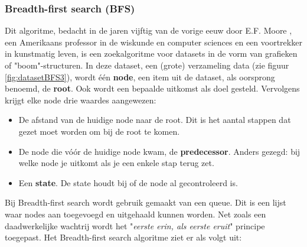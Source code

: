 \subsubsection{Breadth-first search (BFS)}
Dit algoritme, bedacht in de jaren vijftig van de vorige eeuw door E.F. Moore \cite{Moore}, een Amerikaans professor in de wiskunde en computer sciences en een voortrekker in kunstmatig leven, is een zoekalgoritme voor datasets in de vorm van grafieken of "boom"-structuren. In deze dataset, een (grote) verzameling data (zie figuur \ref{fig:datasetBFS3}), wordt \'e\'en \textbf{node}, een item uit de dataset, als oorsprong benoemd, de \textbf{root}. Ook wordt een bepaalde uitkomst als doel gesteld. Vervolgens krijgt elke node drie waardes aangewezen:
\begin{itemize}
\item De afstand van de huidige node naar de root. Dit is het aantal stappen dat gezet moet worden om bij de root te komen. 
\item De node die v\'{o}\'{o}r de huidige node kwam, de \textbf{predecessor}. Anders gezegd: bij welke node je uitkomt als je een enkele stap terug zet.
\item Een \textbf{state}. De state houdt bij of de node al gecontroleerd is.
\end{itemize}

Bij Breadth-first search wordt gebruik gemaakt van een queue. Dit is een lijst waar nodes aan toegevoegd en uitgehaald kunnen worden. Net zoals een daadwerkelijke wachtrij wordt het "\textit{eerste erin, als eerste eruit}" principe toegepast.
Het Breadth-first search algoritme ziet er als volgt uit:

